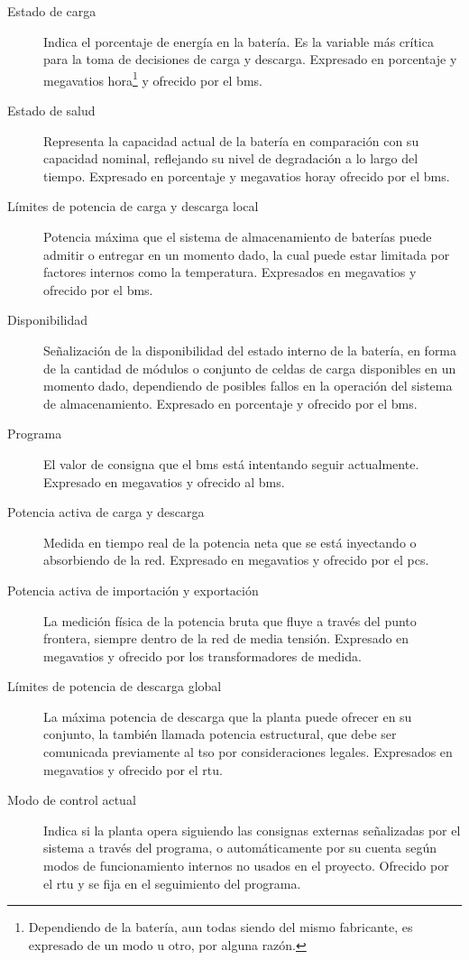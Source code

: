 \begin{description}

  \item[Estado de carga] Indica el porcentaje de energía en la batería. Es la variable más crítica para la toma de decisiones de carga y descarga. Expresado en porcentaje y megavatios hora\footnote{Dependiendo de la batería, aun todas siendo del mismo fabricante, es expresado de un modo u otro, por alguna razón.} y ofrecido por el \gls{bms}.

  \item[Estado de salud] Representa la capacidad actual de la batería en comparación con su capacidad nominal, reflejando su nivel de degradación a lo largo del tiempo. Expresado en porcentaje y megavatios hora\footnotemark[\value{footnote}] y ofrecido por el \gls{bms}.

  \item[Límites de potencia de carga y descarga local] Potencia máxima que el sistema de almacenamiento de baterías puede admitir o entregar en un momento dado, la cual puede estar limitada por factores internos como la temperatura. Expresados en megavatios y ofrecido por el \gls{bms}.

  \item[Disponibilidad] Señalización de la disponibilidad del estado interno de la batería, en forma de la cantidad de módulos o conjunto de celdas de carga disponibles en un momento dado, dependiendo de posibles fallos en la operación del sistema de almacenamiento. Expresado en porcentaje y ofrecido por el \gls{bms}.

  \item[Programa] El valor de consigna que el \gls{bms} está intentando seguir actualmente. Expresado en megavatios y ofrecido al \gls{bms}.

  \item[Potencia activa de carga y descarga] Medida en tiempo real de la potencia neta que se está inyectando o absorbiendo de la red. Expresado en megavatios y ofrecido por el \gls{pcs}.

  \item[Potencia activa de importación y exportación] La medición física de la potencia bruta que fluye a través del punto frontera, siempre dentro de la red de media tensión. Expresado en megavatios y ofrecido por los transformadores de medida.

  \item[Límites de potencia de descarga global] La máxima potencia de descarga que la planta puede ofrecer en su conjunto, la también llamada potencia estructural, que debe ser comunicada previamente al \gls{tso} por consideraciones legales. Expresados en megavatios y ofrecido por el \gls{rtu}.

  \item[Modo de control actual] Indica si la planta opera siguiendo las consignas externas señalizadas por el sistema a través del programa, o automáticamente por su cuenta según modos de funcionamiento internos no usados en el proyecto. Ofrecido por el \gls{rtu} y se fija en el seguimiento del programa.

\end{description}

